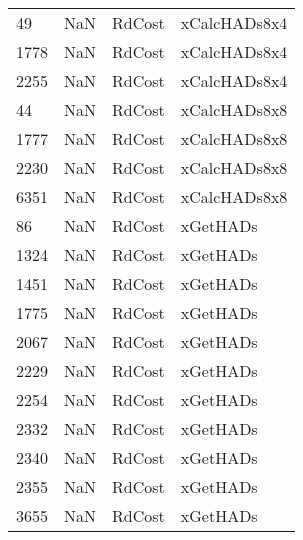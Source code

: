 \begin{tabular}{llll}
49   &                   NaN &                     RdCost &                              xCalcHADs8x4 \\
1778 &                   NaN &                     RdCost &                              xCalcHADs8x4 \\
2255 &                   NaN &                     RdCost &                              xCalcHADs8x4 \\
44   &                   NaN &                     RdCost &                              xCalcHADs8x8 \\
1777 &                   NaN &                     RdCost &                              xCalcHADs8x8 \\
2230 &                   NaN &                     RdCost &                              xCalcHADs8x8 \\
6351 &                   NaN &                     RdCost &                              xCalcHADs8x8 \\
86   &                   NaN &                     RdCost &                                  xGetHADs \\
1324 &                   NaN &                     RdCost &                                  xGetHADs \\
1451 &                   NaN &                     RdCost &                                  xGetHADs \\
1775 &                   NaN &                     RdCost &                                  xGetHADs \\
2067 &                   NaN &                     RdCost &                                  xGetHADs \\
2229 &                   NaN &                     RdCost &                                  xGetHADs \\
2254 &                   NaN &                     RdCost &                                  xGetHADs \\
2332 &                   NaN &                     RdCost &                                  xGetHADs \\
2340 &                   NaN &                     RdCost &                                  xGetHADs \\
2355 &                   NaN &                     RdCost &                                  xGetHADs \\
3655 &                   NaN &                     RdCost &                                  xGetHADs \\

\end{tabular}

